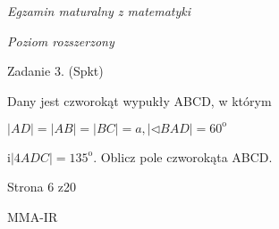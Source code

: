 \documentclass[a4paper,12pt]{article}
\begin{document}
{\it Egzamin maturalny z matematyki}

{\it Poziom rozszerzony}

Zadanie 3. (Spkt)

Dany jest czworokąt wypukły ABCD, w którym

$|AD|=|AB|=|BC|=a, |\triangleleft BAD|=60^{\mathrm{o}}$

$\mathrm{i}|4ADC|=135^{\mathrm{o}}$. Oblicz pole czworokąta ABCD.

Strona 6 z20

MMA-IR
\end{document}
